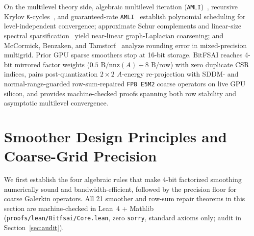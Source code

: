 \documentclass[10pt]{article}
\begin{document}
On the multilevel theory side, algebraic multilevel iteration (\texttt{AMLI})~\cite{axelsson1989amli}, recursive Krylov \texttt{K}-cycles~\cite{notay2008kcycle}, and guaranteed-rate \texttt{AMLI}~\cite{napov2012amli} establish polynomial scheduling for level-independent convergence; approximate Schur complements and linear-size spectral sparsification~\cite{durfee2017schur,lee2015sparsification} yield near-linear graph-Laplacian coarsening; and McCormick, Benzaken, and Tamstorf~\cite{mccormick2021mixed,mccormick2023rounding} analyze rounding error in mixed-precision multigrid. Prior GPU sparse smoothers stop at 16-bit storage. BitFSAI reaches 4-bit mirrored factor weights ($0.5\text{ B/nnz}(A) + 8\text{ B/row}$) with zero duplicate CSR indices, pairs post-quantization $2\times 2$ $A$-energy re-projection with SDDM- and normal-range-guarded row-sum-repaired \texttt{FP8 E5M2} coarse operators on live GPU silicon, and provides machine-checked proofs spanning both row stability and asymptotic multilevel convergence.

\section{Smoother Design Principles and Coarse-Grid Precision}\label{sec:principles}
We first establish the four algebraic rules that make 4-bit factorized smoothing numerically sound and bandwidth-efficient, followed by the precision floor for coarse Galerkin operators. All 21 smoother and row-sum repair theorems in this section are machine-checked in Lean~4 + Mathlib (\texttt{proofs/lean/Bitfsai/Core.lean}, zero \texttt{sorry}, standard axioms only; audit in Section~\ref{sec:audit}).
\end{document}
